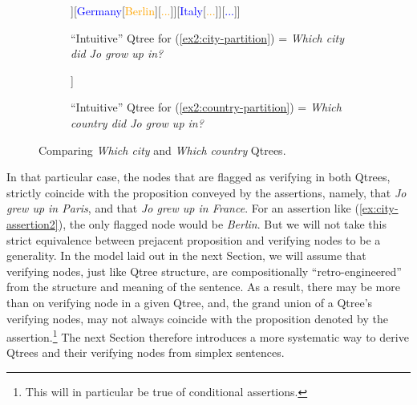 \begin{figure}[H]
	\centering
	\begin{subfigure}[t]{.45\linewidth}
		\centering
		\begin{forest}
			[{CS\\
				Jo grew up in...}[\textcolor{blue}{France}[\textcolor{orange}{{\fbox{Paris}}}][\textcolor{orange}{Lyon}][\textcolor{orange}{...}]][\textcolor{blue}{Germany}[\textcolor{orange}{Berlin}][\textcolor{orange}{...}]][\textcolor{blue}{Italy}[\textcolor{orange}{...}]][\textcolor{blue}{...}]]
		\end{forest}
		\caption{``Intuitive'' Qtree for (\ref{ex2:city-partition}) = \textit{Which city did Jo grow up in?}}\label{fig2:paris-qtree}
	\end{subfigure}\hfill
	\begin{subfigure}[t]{.45\linewidth}
		\centering
		\begin{forest}
			[{CS\\
				Jo grew up in...}[\textcolor{blue}{\fbox{France}}][\textcolor{blue}{Germany}][\textcolor{blue}{Italy}][\textcolor{blue}{...}]]
		\end{forest}
		\caption{``Intuitive'' Qtree for (\ref{ex2:country-partition}) = \textit{Which country did Jo grow up in?}}\label{fig2:france-qtree}
	\end{subfigure}
	\caption{Comparing \textit{Which city} and \textit{Which country} Qtrees.}\label{fig:paris-france-qtrees}
\end{figure}

In that particular case, the nodes that are flagged as verifying in both Qtrees, strictly coincide with the proposition conveyed by the assertions, namely, that \textit{Jo grew up in Paris}, and that \textit{Jo grew up in France}. For an assertion like (\ref{ex:city-assertion2}), the only flagged node would be \textit{Berlin}. But we will not take this strict equivalence between prejacent proposition and verifying nodes to be a generality. In the model laid out in the next Section, we will assume that verifying nodes, just like Qtree structure, are compositionally ``retro-engineered'' from the structure and meaning of the sentence. As a result, there may be more than on verifying node in a given Qtree, and, the grand union of a Qtree's verifying nodes, may not always coincide with the proposition denoted by the assertion.\footnote{This will in particular be true of conditional assertions.}
The next Section therefore introduces a more systematic way to derive Qtrees and their verifying nodes from simplex sentences.


